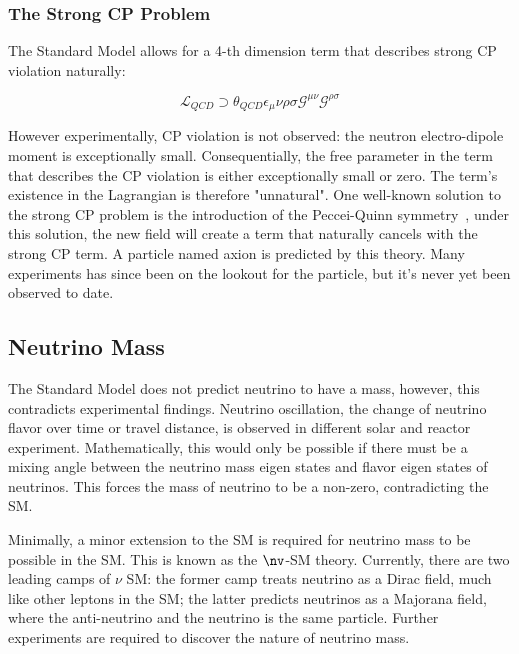\subsubsection{The Strong CP Problem}
The Standard Model allows for a 4-th dimension term that describes strong CP violation naturally:

\begin{equation}
    \mathcal{L}_{QCD} \supset \theta_{QCD}\epsilon_\mu\nu\rho\sigma \mathcal{G}^{\mu\nu}\mathcal{G}^{\rho\sigma}
\end{equation}

However experimentally, CP violation is not observed: the neutron electro-dipole moment is exceptionally small. Consequentially, the free parameter in the term that describes the CP violation is either exceptionally small or zero. The term's existence in the Lagrangian is therefore "unnatural".
One well-known solution to the strong CP problem is the introduction of the Peccei-Quinn symmetry~\cite{PQSym}, under this solution, the new field will create a term that naturally cancels with the strong CP term. A particle named axion is predicted by this theory. Many experiments has since been on the lookout for the particle, but it's never yet been observed to date.

\subsection{Neutrino Mass}
The Standard Model does not predict neutrino to have a mass, however, this contradicts experimental findings. Neutrino oscillation, the change of neutrino flavor over time or travel distance, is observed in different solar and reactor experiment. Mathematically, this would only be possible if there must be a mixing angle between the neutrino mass eigen states and flavor eigen states of neutrinos. This forces the mass of neutrino to be a non-zero, contradicting the SM.

Minimally, a minor extension to the SM is required for neutrino mass to be possible in the SM. This is known as the $\nv$-SM theory. Currently, there are two leading camps of $\nu$ SM: the former camp treats neutrino as a Dirac field, much like other leptons in the SM; the latter predicts neutrinos as a Majorana field, where the anti-neutrino and the neutrino is the same particle. Further experiments are required to discover the nature of neutrino mass. 




